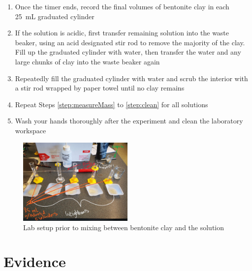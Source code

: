 \documentclass[11pt, letterpaper]{article}
\begin{document}
\begin{enumerate}
    \item Once the timer ends, record the final volumes of bentonite clay in each \SI{25}{mL} graduated cylinder
    \item If the solution is acidic, first transfer remaining solution into the waste beaker, using an acid designated stir rod to remove the majority of the clay. Fill up the graduated cylinder with water, then transfer the water and any large chunks of clay into the waste beaker again
    \item \label{step:clean} Repeatedly fill the graduated cylinder with water and scrub the interior with a stir rod wrapped by paper towel until no clay remains
    \item Repeat Steps \ref*{step:measureMass} to \ref*{step:clean} for all solutions
    \item Wash your hands thoroughly after the experiment and clean the laboratory workspace
\end{enumerate}


\begin{figure}[H]
    \centering
    \includegraphics[width=0.5\textwidth]{labSetup.jpg}
    \caption{Lab setup prior to mixing between bentonite clay and the solution}
    \label{fig:labSetup}
\end{figure}


\section{Evidence}
\end{document}

